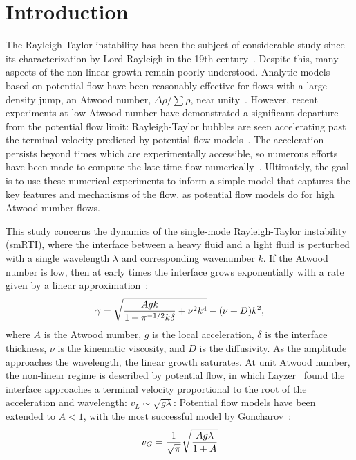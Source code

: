 \section{Introduction} 

The Rayleigh-Taylor instability has been the subject of considerable study since its characterization by Lord Rayleigh in the 19th century~\cite{Rayleigh1883}.
Despite this, many aspects of the non-linear growth remain poorly understood.
Analytic models based on potential flow have been reasonably effective for flows with a large density jump, \ie an Atwood number, $\Delta \rho / \sum \rho$, near unity~\cite{Layzer1955, Layzer1955}.
However, recent experiments at low Atwood number have demonstrated a significant departure from the potential flow limit:
Rayleigh-Taylor bubbles are seen accelerating past the terminal velocity predicted by potential flow models~\cite{Wilkinson2007}.
The acceleration persists beyond times which are experimentally accessible, so numerous efforts have been made to compute the late time flow numerically~\cite{Ramaprabhu2012,Wei2012}.
Ultimately, the goal is to use these numerical experiments to inform a simple model that captures the key features and mechanisms of the flow, as potential flow models do for high Atwood number flows.

This study concerns the dynamics of the single-mode Rayleigh-Taylor instability (smRTI), where the interface between a heavy fluid and a light fluid is perturbed with a single wavelength $\lambda$ and corresponding wavenumber $k$.
If the Atwood number is low, then at early times the interface grows exponentially with a rate given by a linear approximation~\cite{Duff1962}:
\begin{equation} \elabel{duff0}
\gamma = \sqrt{\frac{A g k}{1 + \pi^{-1/2} k \delta} + \nu^2 k^4} - (\nu + D) k^2,
\end{equation}
where $A$ is the Atwood number,
$g$ is the local acceleration,
$\delta$ is the interface thickness,
$\nu$ is the kinematic viscosity, and
$D$ is the diffusivity.
As the amplitude approaches the wavelength, the linear growth saturates.
At unit Atwood number, the non-linear regime is described by potential flow, in which Layzer~\cite{Layzer1955} found the interface approaches a terminal velocity proportional to the root of the acceleration and wavelength: $v_L \sim \sqrt{g \lambda}$:
Potential flow models have been extended to $A < 1$, with the most successful model by Goncharov~\cite{Goncharov2002}:
\begin{equation} \elabel{goncharov}
v_G = \frac{1}{\sqrt{\pi}} \sqrt{\frac{A g \lambda}{1+A}}
\end{equation}

